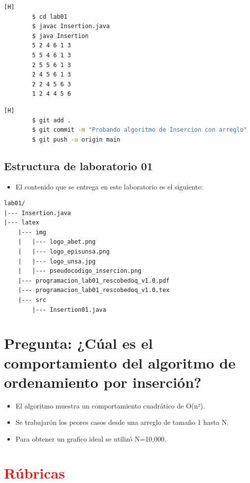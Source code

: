 \documentclass{article}
\begin{document}
	\begin{lstlisting}[language=bash,caption={Compilando y probando código}][H]
		$ cd lab01
		$ javac Insertion.java
		$ java Insertion
		5 2 4 6 1 3 
		5 5 4 6 1 3 
		2 5 5 6 1 3 
		2 4 5 6 1 3 
		2 2 4 5 6 3 
		1 2 4 4 5 6
	\end{lstlisting}
	\begin{lstlisting}[language=bash,caption={Commit: Probando algoritmo de Inserción con arreglo}][H]
		$ git add .
		$ git commit -m "Probando algoritmo de Insercion con arreglo"			
		$ git push -u origin main
	\end{lstlisting}
	
		
	\subsection{Estructura de laboratorio 01}
	\begin{itemize}	
		\item El contenido que se entrega en este laboratorio es el siguiente:
	\end{itemize}
	
\begin{lstlisting}[style=ascii-tree]
lab01/
|--- Insertion.java
|--- latex
    |--- img
    |   |--- logo_abet.png
    |   |--- logo_episunsa.png
    |   |--- logo_unsa.jpg
    |   |--- pseudocodigo_insercion.png    
    |--- programacion_lab01_rescobedoq_v1.0.pdf    
    |--- programacion_lab01_rescobedoq_v1.0.tex
    |--- src
        |--- Insertion01.java
\end{lstlisting}    

\section{Pregunta: ¿Cúal es el comportamiento del algoritmo de ordenamiento por inserción?}
	\begin{itemize}
		\item El algoritmo muestra un comportamiento cuadrático de O(n²).
		\item Se trabajarón los peores casos desde una arreglo de tamaño 1 hasta N.
		\item Para obtener un grafico ideal se utilizó N=10,000.
	\end{itemize}		

	\section{\textcolor{red}{Rúbricas}}
	
\end{document}
